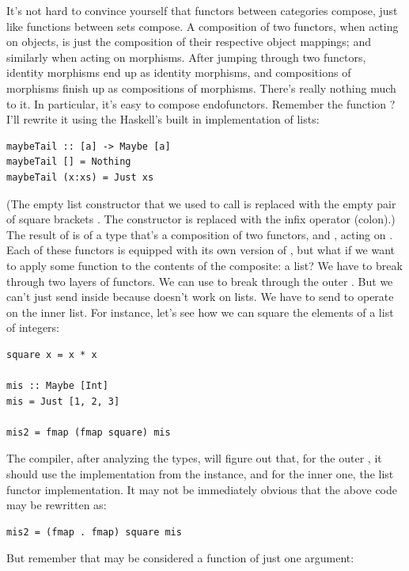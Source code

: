 It's not hard to convince yourself that functors between categories
compose, just like functions between sets compose. A composition of two
functors, when acting on objects, is just the composition of their
respective object mappings; and similarly when acting on morphisms.
After jumping through two functors, identity morphisms end up as
identity morphisms, and compositions of morphisms finish up as
compositions of morphisms. There's really nothing much to it. In
particular, it's easy to compose endofunctors. Remember the function
? I'll rewrite it using the Haskell's built in
implementation of lists:

\begin{Verbatim}[commandchars=\\\{\}]
maybeTail :: [a] -> Maybe [a]
maybeTail [] = Nothing
maybeTail (x:xs) = Just xs
\end{Verbatim}
(The empty list constructor that we used to call  is
replaced with the empty pair of square brackets \code{{[}{]}}. The
 constructor is replaced with the infix operator \code{:}
(colon).) The result of  is of a type that's a
composition of two functors,  and \code{{[}{]}}, acting
on . Each of these functors is equipped with its own version
of , but what if we want to apply some function 
to the contents of the composite: a  list? We have to
break through two layers of functors. We can use  to break
through the outer . But we can't just send 
inside  because  doesn't work on lists. We have
to send  to operate on the inner list. For instance,
let's see how we can square the elements of a  list of
integers:

\begin{Verbatim}[commandchars=\\\{\}]
square x = x * x

mis :: Maybe [Int]
mis = Just [1, 2, 3]

mis2 = fmap (fmap square) mis
\end{Verbatim}
The compiler, after analyzing the types, will figure out that, for the
outer , it should use the implementation from the
 instance, and for the inner one, the list functor
implementation. It may not be immediately obvious that the above code
may be rewritten as:

\begin{Verbatim}[commandchars=\\\{\}]
mis2 = (fmap . fmap) square mis
\end{Verbatim}
But remember that  may be considered a function of just one
argument:

